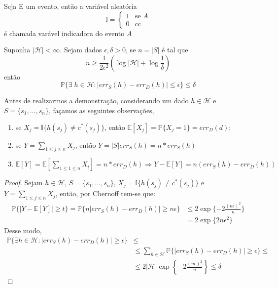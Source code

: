 \begin{definition}
Seja E um evento, então a variável aleatória
\[
   \mathbb{I} = 
  \begin{cases} 
   1 & \text{se } A \\
   0       & \text{cc }
  \end{cases}
\]
é chamada varável indicadora do evento $A$
\end{definition}

\begin{theorem}
\label{theorem_ap_mq_1}
Suponha $|\mathcal{H}| < \infty$. Sejam dados  $\epsilon, \delta > 0$, se $n = |S|$ é tal que
\begin{equation*}
n \geq \frac{1}{2\epsilon^2}\left(\log{|\mathcal{H}|} + \log{\frac{1}{\delta}}\right)
\end{equation*}{}
então
\begin{equation*}
    \mathbb{P} \{\exists \; h \in \mathcal{H} :|err_S(h) - err_D(h)| \leq \epsilon\} \leq \delta
\end{equation*}{}
\end{theorem}
Antes de realizarmos a demonstração, considerando um dado $h \in \mathcal{H}$ e $S = \{s_1, \dots, s_n\}$, façamos as seguintes observações, 
\begin{enumerate}
    \item se $X_j = \mathbb{I}\{h(s_j) \neq c^*(s_j)\}$, então $\mathbb{E}[X_j] = \mathbb{P}\{X_j = 1\} = err_D(d)$;
    \item se $Y = \sum_{1 \leq j \leq n}{X_j}$, então $Y = |S|err_S(h) = n*err_S(h)$
    \item $\mathbb{E}[Y] = \mathbb{E}[\sum_{1 \leq 1 \leq n}{X_i}] = n * err_D(h) \Rightarrow Y - \mathbb{E}[Y] = n(err_S(h) - err_D(h))$
\end{enumerate}{}
\begin{proof}
Sejam $h \in \mathcal{H}$, $S = \{s_1, \dots, s_n\}$, $X_j = \mathbb{I}\{h(s_j) \neq c^*(s_j)\}$ e $Y = \sum_{1 \leq j \leq n}{X_j}$, então, por Chernoff tem-se que:
\begin{align*}
    \mathbb{P}\{|Y - \mathbb{E}[Y]| \geq t\} = \mathbb{P}\{n|err_S(h) - err_D(h)| \geq n\epsilon\} &\leq 2\exp\{-2\frac{(n\epsilon)^2}{n}\} \\
    &= 2\exp\{2n\epsilon^2\}
\end{align*}
Desse modo,
\begin{align*}
    \mathbb{P}\{\exists h \in \mathcal{H} : |err_S(h) - err_D(h)| \geq \epsilon\} & \leq \\
    &\leq \sum_{h \in \mathcal{H}}\mathbb{P}\{|err_S(h) - err_D(h)| \geq \epsilon\} \leq \\
    &\leq 2|\mathcal{H}|\exp\left\{-2\frac{(n\epsilon)^2}{n}\right\} \leq \delta
\end{align*}{}

\end{proof}
